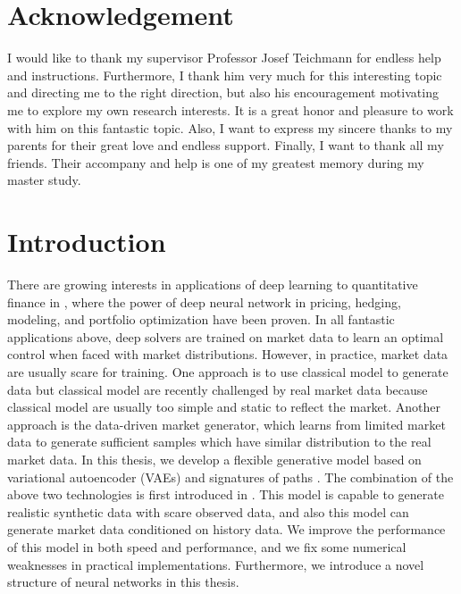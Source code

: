 \documentclass[12pt]{report}
\theoremstyle{definition}
\theoremstyle{remark}
\begin{document}
\tableofcontents
\chapter*{Acknowledgement}
I would like to thank my supervisor Professor Josef Teichmann for endless help and instructions. Furthermore, I thank him very much for this interesting topic and directing me to the right direction, but also his encouragement motivating me to explore my own research interests. It is a great honor and pleasure to work with him on this fantastic topic. Also, I want to express my sincere thanks to my parents for their great love and endless support. Finally, I want to thank all my friends. Their accompany and help is one of my greatest memory during my master study.    

\chapter{Introduction}\label{introduction}
There are growing interests in applications of deep learning to quantitative finance in \cite{bayerdeep, buehler2019deep, cuchiero2020generative, cont2004recovering, henry2019martingale, horvath2019deep, ruf2020neural, zhang2019stock}, where the power of deep neural network in pricing, hedging, modeling, and portfolio optimization have been proven. In all fantastic applications above, deep solvers are trained on market data to learn an optimal control when faced with market distributions. However, in practice, market data are usually scare for training. One approach is to use classical model to generate data but classical model are recently challenged by real market data because classical model are usually too simple and static to reflect the market. Another approach is the data-driven market generator, which learns from limited market data to generate sufficient samples which have similar distribution to the real market data. In this thesis, we develop a flexible generative model based on variational autoencoder (VAEs) \cite{kingma2019introduction} and signatures of paths \cite{friz2020course}. The combination of the above two technologies is first introduced in \cite{buehler2020data}. This model is capable to generate realistic synthetic data with scare observed data, and also this model can generate market data conditioned on history data. We improve the performance of this model in both speed and performance, and we fix some numerical weaknesses in practical implementations. Furthermore, we introduce a novel structure of neural networks in this thesis.  
\end{document}
